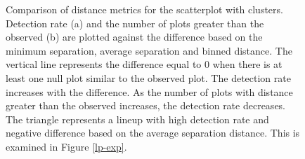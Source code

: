 \documentclass[12]{article}
\begin{document}
\begin{figure}[hbtp]
\centering
{}
	\vspace{-.1in}
\caption[Optional caption for list of figures]{Comparison of distance metrics for the scatterplot with clusters. Detection rate (a) and the number of plots greater than the observed (b) are plotted against the difference based on the minimum separation, average separation and binned distance. The vertical line represents the difference equal to 0 when there is at least one null plot similar to the observed plot. The detection rate increases with the difference. As the number of plots with distance greater than the observed increases, the detection rate decreases. The triangle represents a lineup with high detection rate and negative difference based on the average separation distance. This is examined in Figure \ref{lp-exp}. }
\label{lp-comp}
\end{figure}
\end{document}
